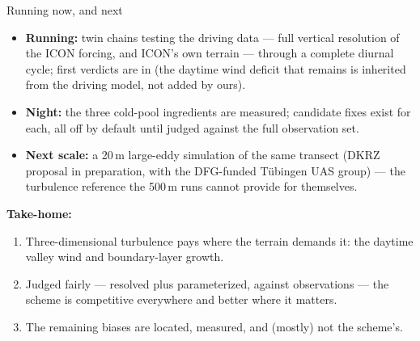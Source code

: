 \documentclass[10pt,aspectratio=169]{beamer}
\begin{document}
\begin{frame}{Running now, and next}
  \begin{itemize}
    \item \textbf{Running:} twin chains testing the driving data --- full
      vertical resolution of the ICON forcing, and ICON's own terrain ---
      through a complete diurnal cycle; first verdicts are in (the daytime
      wind deficit that remains is inherited from the driving model, not
      added by ours).
    \item \textbf{Night:} the three cold-pool ingredients are measured;
      candidate fixes exist for each, all off by default until judged
      against the full observation set.
    \item \textbf{Next scale:} a 20\,m large-eddy simulation of the same
      transect (DKRZ proposal in preparation, with the DFG-funded Tübingen
      UAS group) --- the turbulence reference the 500\,m runs cannot provide
      for themselves.
  \end{itemize}
  \vspace{2ex}
  \textbf{Take-home:}
  \begin{enumerate}
    \item Three-dimensional turbulence pays where the terrain demands it:
      the daytime valley wind and boundary-layer growth.
    \item Judged fairly --- resolved plus parameterized, against
      observations --- the scheme is competitive everywhere and better where
      it matters.
    \item The remaining biases are located, measured, and (mostly) not the
      scheme's.
  \end{enumerate}
\end{frame}
\end{document}
